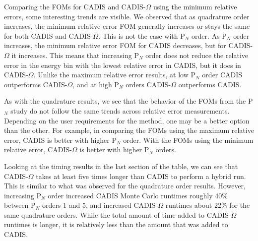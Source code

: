Comparing the FOMs for CADIS and CADIS-$\Omega$ using the minimum relative
errors, some interesting trends are visible. We
observed that as quadrature order increases, the minimum relative error FOM
generally increases or stays the same for both CADIS and
CADIS-$\Omega$. This is not the case with P$_N$ order. As P$_N$ order
increases, the minimum relative error FOM for CADIS decreases, but for
CADIS-$\Omega$ it increases. This means that increasing P$_N$ order does not
reduce the relative error in the energy bin with the
lowest relative error in CADIS, but it does in CADIS-$\Omega$. Unlike the
maximum relative error results, at low P$_N$ order CADIS
outperforms CADIS-$\Omega$, and at high P$_N$ orders CADIS-$\Omega$ outperforms
CADIS.

As with the quadrature results, we see that the
behavior of the FOMs from the P$_N$ study do not follow the same trends across relative
error measurements. Depending on the user requirements for the method, one may
be a better option than the other. For example, in comparing the FOMs using the
maximum relative error, CADIS is better with higher P$_N$ order. With the FOMs
using the minimum relative error, CADIS-$\Omega$ is better with higher P$_N$
orders.

Looking at the timing results in the last
section of the table, we can see that CADIS-$\Omega$ takes at least five times
longer than CADIS to perform a hybrid run. This is similar to what was observed
for the quadrature order results. However, increasing P$_N$ order increased
CADIS Monte Carlo runtimes roughly 40\% between P$_N$ orders 1 and 5, and
increased CADIS-$\Omega$ runtimes about 22\% for the same quadrature orders.
While the total amount of time added to CADIS-$\Omega$ runtimes is longer, it is
relatively less than the amount that was added to CADIS.

